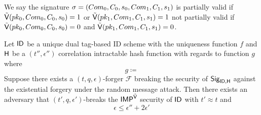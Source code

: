 We say the signature  $\sigma = (Com_{0},C_{0},s_{0}, Com_{1}, C_{1},s_{1})$ is
partially valid if $\tilde{\mathsf{V}}(pk_0,Com_0,C_0,s_0) =1$ or $\tilde{\mathsf{V}}(pk_1,Com_1,C_1,s_1) = 1$
not partially valid if 
 $\tilde{\mathsf{V}}(pk_0,Com_0,C_0,s_0) =0$ and $\tilde{\mathsf{V}}(pk_1,Com_1,C_1,s_1) =0$.
\begin{theorem}
Let  $\mathsf{ID}$ be a unique dual tag-based ID scheme with the uniqueness function $f$ and $\mathsf{H}$ be a $(t'',\epsilon'')$ correlation intractable hash function with regards to function $g$ where
$$g \coloneqq $$
Suppose there exists a $(t,q,\epsilon)$-forger $\mathcal{F}$ breaking the security of $\mathsf{Sig}_{\mathsf{ID},\mathsf{H}}$ against the existential forgery under the random message attack. Then there exists an adversary that $(t',q,\epsilon')$-breaks the $\mathsf{IMP}^{\tilde{\mathsf{V}}}$ security of $\mathsf{ID}$ with $t' \approx t$ and
$$ \epsilon \leq \epsilon'' + 2\epsilon'$$
\end{theorem}
